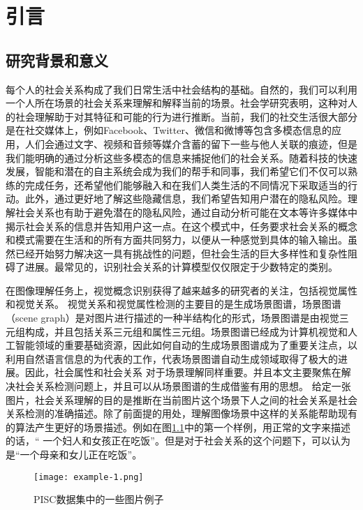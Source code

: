 

\chapter{引言}
\label{ch:intro}

\section{研究背景和意义}

每个人的社会关系构成了我们日常生活中社会结构的基础。自然的，我们可以利用一个人所在场景的社会关系来理解和解释当前的场景。社会学研究表明，这种对人的社会理解助于对其特征和可能的行为进行推断。当前，我们的社交生活很大部分是在社交媒体上，例如Facebook、Twitter、微信和微博等包含多模态信息的应用，人们会通过文字、视频和音频等媒介含蓄的留下一些与他人关联的痕迹，但是我们能明确的通过分析这些多模态的信息来捕捉他们的社会关系。随着科技的快速发展，智能和潜在的自主系统会成为我们的帮手和同事，我们希望它们不仅可以熟练的完成任务，还希望他们能够融入和在我们人类生活的不同情况下采取适当的行动。此外，通过更好地了解这些隐藏信息，我们希望告知用户潜在的隐私风险。理解社会关系也有助于避免潜在的隐私风险，通过自动分析可能在文本等许多媒体中揭示社会关系的信息并告知用户这一点。在这个模式中，任务要求社会关系的概念和模式需要在生活和的所有方面共同努力，以便从一种感觉到具体的输入输出。虽然已经开始努力解决这一具有挑战性的问题，但社会生活的巨大多样性和复杂性阻碍了进展。最常见的，识别社会关系的计算模型仅仅限定于少数特定的类别。

在图像理解任务上，视觉概念识别获得了越来越多的研究者的关注，包括视觉属性和视觉关系\cite{lu2016visual}。
视觉关系和视觉属性检测的主要目的是生成场景图谱，场景图谱（scene graph）\cite{johnson2015image}是对图片进行描述的一种半结构化的形式，场景图谱是由视觉三元组构成，并且包括关系三元组和属性三元组。场景图谱已经成为计算机视觉和人工智能领域的重要基础资源，因此如何自动的生成场景图谱成为了重要关注点，以利用自然语言信息的\cite{lu2016visual}为代表的工作，代表场景图谱自动生成领域取得了极大的进展。因此，社会属性和社会关系\cite{wang2010seeing} 对于场景理解同样重要。并且本文主要聚焦在解决社会关系检测问题上，并且可以从场景图谱的生成借鉴有用的思想。
给定一张图片，社会关系理解的目的是推断在当前图片这个场景下人之间的社会关系是社会关系检测的准确描述。除了前面提的用处，理解图像场景中这样的关系能帮助现有的算法产生更好的场景描述。例如在图\ref{fig:intro-example}中的第一个样例，用正常的文字来描述的话，`` 一个妇人和女孩正在吃饭''。但是对于社会关系的这个问题下，可以认为是``一个母亲和女儿正在吃饭''。
\begin{figure}[htpb]
	\centering
	\texttt{[image: example-1.png]}
    \caption{PISC数据集中的一些图片例子}
	\vspace*{-3.5mm}
	\label{fig:intro-example}
\end{figure}


